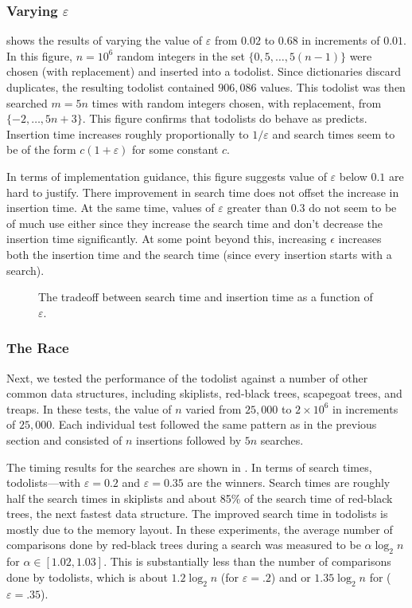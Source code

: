 \documentclass[12pt]{patmorin}
\newcommand{\eps}{\varepsilon}
\begin{document}
\subsubsection{Varying $\eps$}

 shows the results of varying the value of $\eps$ from
$0.02$ to $0.68$ in increments of $0.01$. In this figure, $n=10^6$
random integers in the set $\{0, 5,\ldots,5(n-1)\}$ were chosen
(with replacement) and inserted into a todolist. Since dictionaries
discard duplicates, the resulting todolist contained $906,086$ values.
This todolist was then searched $m=5n$ times with random integers chosen,
with replacement, from $\{-2,\ldots,5n+3\}$.  This figure confirms
that todolists do behave as  predicts.  Insertion time
increases roughly proportionally to $1/\eps$ and search times seem to be
of the form $c(1+\eps)$ for some constant $c$.

In terms of implementation guidance, this figure suggests value of
$\eps$ below $0.1$ are hard to justify.  There improvement in search
time does not offset the increase in insertion time.  At the same time,
values of $\eps$ greater than $0.3$ do not seem to be of much use either
since they increase the search time and don't decrease the insertion
time significantly. At some point beyond this, increasing $\epsilon$
increases both the insertion time and the search time (since every
insertion starts with a search).

\begin{figure}
  \centering{}
  \caption{The tradeoff between search time and insertion time as a function of $\eps$.}
\end{figure}

\subsubsection{The Race}

Next, we tested the performance of the todolist against a number of
other common data structures, including skiplists, red-black trees,
scapegoat trees, and treaps. In these tests, the value of $n$ varied from
$25,000$ to $2\times 10^6$ in increments of $25,000$.   Each individual
test followed the same pattern as in the previous section and consisted
of $n$ insertions followed by $5n$ searches.

The timing results for the searches are shown in . In
terms of search times, todolists---with $\eps = 0.2$ and $\eps=0.35$
are the winners.  Search times are roughly half the search times in
skiplists and about 85\% of the search time of red-black trees, the next
fastest data structure.  The improved search time in todolists is mostly
due to the memory layout.  In these experiments, the average number
of comparisons done by red-black trees during a search was measured to
be $\alpha\log_2 n$ for $\alpha\in[1.02,1.03]$. This is substantially
less than the number of comparisons done by todolists, which is about
$1.2\log_2 n$ (for $\eps=.2$) and or $1.35\log_2 n$ for ($\eps=.35$).
\end{document}
